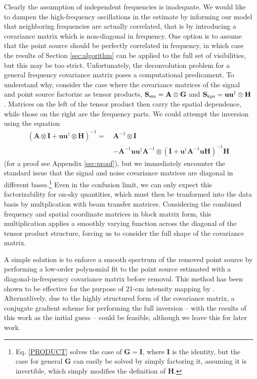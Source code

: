 Clearly the assumption of independent frequencies is inadequate. We would like to dampen the high-frequency oscillations in the estimate by informing our model that neighboring frequencies are actually correlated, that is by introducing a covariance matrix which is non-diagonal in frequency. One option is to assume that the point source should be perfectly correlated in frequency, in which case the results of Section \ref{sec:algorithm} can be applied to the full set of visibilities, but this may be too strict. Unfortunately, the deconvolution problem for a general frequency covariance matrix poses a computational predicament. To understand why, consider the case where the covariance matrices of the signal and point source factorize as tensor products, $\mathbf{S}_{\rm sm} = \mathbf{A} \otimes\mathbf{G}$ and $\mathbf{S}_{\rm kps} = \mathbf{u}\mathbf{u}^\dagger \otimes\mathbf{H}$. Matrices on the left of the tensor product then carry the spatial dependence, while those on the right are the frequency parts. We could attempt the inversion using the equation
\begin{align}
\left(\mathbf{A} \otimes \mathbf{I} + \mathbf{u}\mathbf{u}^\dagger \otimes \mathbf{H} \right)^{-1} = ~& \mathbf{A}^{-1} \otimes \mathbf{I} \label{PRODUCT}
\\ &- \mathbf{A}^{-1}\mathbf{u}\mathbf{u}^\dagger\mathbf{A}^{-1} \otimes \left(\mathbf{I} + \mathbf{u}^\dagger\mathbf{A}^{-1}\mathbf{u} \mathbf{H}\right)^{-1} \mathbf{H} \nonumber
\end{align}
(for a proof see Appendix \ref{sec:proof}), but we immediately encounter the standard issue that the signal and noise covariance matrices are diagonal in different bases.\footnote{Eq. \eqref{PRODUCT} solves the case of $\mathbf{G}=\mathbf{I}$, where $\mathbf{I}$ is the identity, but the case for general $\mathbf{G}$ can easily be solved by simply factoring it, assuming it is invertible, which simply modifies the definition of $\mathbf{H}$.} Even in the confusion limit, we can only expect this factorizability for on-sky quantities, which must then be tranformed into the data basis by multplication with beam transfer matrices. Considering the combined frequency and spatial coordinate matrices in block matrix form, this multiplication applies a smoothly varying function across the diagonal of the tensor product structure, forcing us to consider the full shape of the covariance matrix.

A simple solution is to enforce a smooth spectrum of the removed point source by performing a low-order polynomial fit to the point source estimated with a diagonal-in-frequency covariance matrix before removal. This method has been shown to be effective for the purpose of 21-cm intensity mapping by \cite{barry2016}. Alternatlively, due to the highly structured form of the covariance matrix, a conjugate gradient scheme for performing the full inversion -- with the results of this work as the initial guess -- could be feasible, although we leave this for later work.

